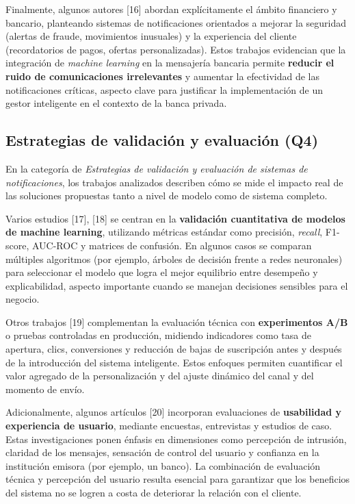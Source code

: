 \documentclass[conference]{IEEEtran}
\begin{document}
Finalmente, algunos autores [16] abordan explícitamente el ámbito financiero y bancario, planteando sistemas de notificaciones orientados a mejorar la seguridad (alertas de fraude, movimientos inusuales) y la experiencia del cliente (recordatorios de pagos, ofertas personalizadas). Estos trabajos evidencian que la integración de \textit{machine learning} en la mensajería bancaria permite \textbf{reducir el ruido de comunicaciones irrelevantes} y aumentar la efectividad de las notificaciones críticas, aspecto clave para justificar la implementación de un gestor inteligente en el contexto de la banca privada.

\subsection{Estrategias de validación y evaluación (Q4)}

En la categoría de \textit{Estrategias de validación y evaluación de sistemas de notificaciones}, los trabajos analizados describen cómo se mide el impacto real de las soluciones propuestas tanto a nivel de modelo como de sistema completo.

Varios estudios [17], [18] se centran en la \textbf{validación cuantitativa de modelos de machine learning}, utilizando métricas estándar como precisión, \textit{recall}, F1-score, AUC-ROC y matrices de confusión. En algunos casos se comparan múltiples algoritmos (por ejemplo, árboles de decisión frente a redes neuronales) para seleccionar el modelo que logra el mejor equilibrio entre desempeño y explicabilidad, aspecto importante cuando se manejan decisiones sensibles para el negocio.

Otros trabajos [19] complementan la evaluación técnica con \textbf{experimentos A/B} o pruebas controladas en producción, midiendo indicadores como tasa de apertura, clics, conversiones y reducción de bajas de suscripción antes y después de la introducción del sistema inteligente. Estos enfoques permiten cuantificar el valor agregado de la personalización y del ajuste dinámico del canal y del momento de envío.

Adicionalmente, algunos artículos [20] incorporan evaluaciones de \textbf{usabilidad y experiencia de usuario}, mediante encuestas, entrevistas y estudios de caso. Estas investigaciones ponen énfasis en dimensiones como percepción de intrusión, claridad de los mensajes, sensación de control del usuario y confianza en la institución emisora (por ejemplo, un banco). La combinación de evaluación técnica y percepción del usuario resulta esencial para garantizar que los beneficios del sistema no se logren a costa de deteriorar la relación con el cliente.
\end{document}
